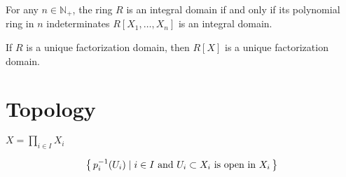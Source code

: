 \begin{corollary}
    For any \(n \in \mathbb{N}_+\), the ring \(R\) is an integral domain if and only if its polynomial ring in \(n\) indeterminates \(R[X_1, \ldots, X_n]\) is an integral domain.
\end{corollary}

\begin{proposition}
    If \(R\) is a unique factorization domain, then \(R[X]\) is a unique factorization domain.
\end{proposition}

\part{Topology}

\begin{defbox}
    \begin{definition}
        \label{def:product_topology}
        \(X = \prod_{i \in I} X_i\)

        \begin{align*}
            \left\{\, p_{i}^{-1}(U_i) \mathrel{\mid} i \in I \text{ and } U_i \subset X_i \text{ is open in }X_i \,\right\}
        \end{align*}
    \end{definition}
\end{defbox}